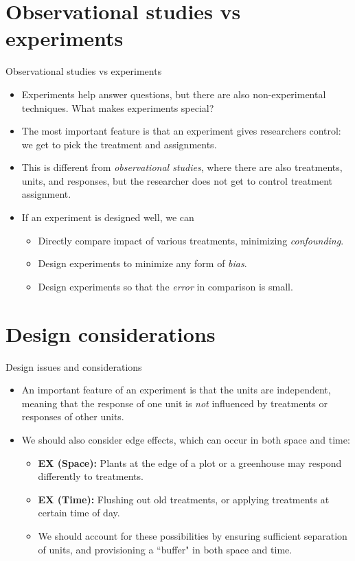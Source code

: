 \section{Observational studies vs experiments}

\begin{frame}[allowframebreaks]{Observational studies vs experiments}
  \begin{itemize}
    \item Experiments help answer questions, but there are also non-experimental techniques. What makes experiments special?
    \item The most important feature is that an experiment gives researchers control: we get to pick the treatment and assignments.
    \item This is different from \emph{observational studies}, where there are also treatments, units, and responses, but the researcher does not get to control treatment assignment.
    \framebreak
    \item If an experiment is designed well, we can
    \begin{itemize}
      \item Directly compare impact of various treatments, minimizing \emph{confounding}.
      \item Design experiments to minimize any form of \emph{bias}.
      \item Design experiments so that the \emph{error} in comparison is small.
    \end{itemize}
  \end{itemize}
\end{frame}

\section{Design considerations}

\begin{frame}[allowframebreaks]{Design issues and considerations}
  \begin{itemize} 
    \item An important feature of an experiment is that the units are \alert{independent}, meaning that the response of one unit is \emph{not} influenced by treatments or responses of other units.
    \item We should also consider \alert{edge effects}, which can occur in both space and time:
    \begin{itemize}
      \item \textbf{EX (Space):} Plants at the edge of a plot or a greenhouse may respond differently to treatments.
      \item \textbf{EX (Time):} Flushing out old treatments, or applying treatments at certain time of day.
      \item We should account for these possibilities by ensuring sufficient separation of units, and provisioning a ``buffer" in both space and time. 
    \end{itemize}
  \end{itemize}
\end{frame}

